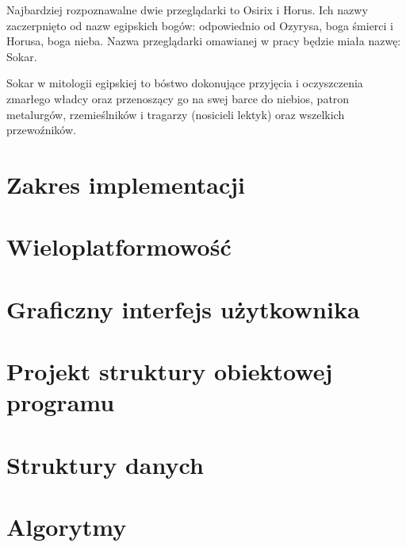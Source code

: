 
\par
Najbardziej rozpoznawalne dwie przeglądarki to Osirix i Horus.
Ich nazwy zaczerpnięto od nazw egipskich bogów: odpowiednio od Ozyrysa, boga śmierci i Horusa, boga nieba.
Nazwa przeglądarki omawianej w pracy będzie miała nazwę: Sokar.
\par
Sokar w mitologii egipskiej to bóstwo dokonujące przyjęcia i oczyszczenia zmarłego władcy oraz przenoszący go na swej barce do niebios, patron metalurgów, rzemieślników i tragarzy (nosicieli lektyk) oraz wszelkich przewoźników.

\section{Zakres implementacji}


\section{Wieloplatformowość}


\section{Graficzny interfejs użytkownika}
\sokarclassExplanations


\section{Projekt struktury obiektowej programu}


\section{Struktury danych}


\section{Algorytmy}
